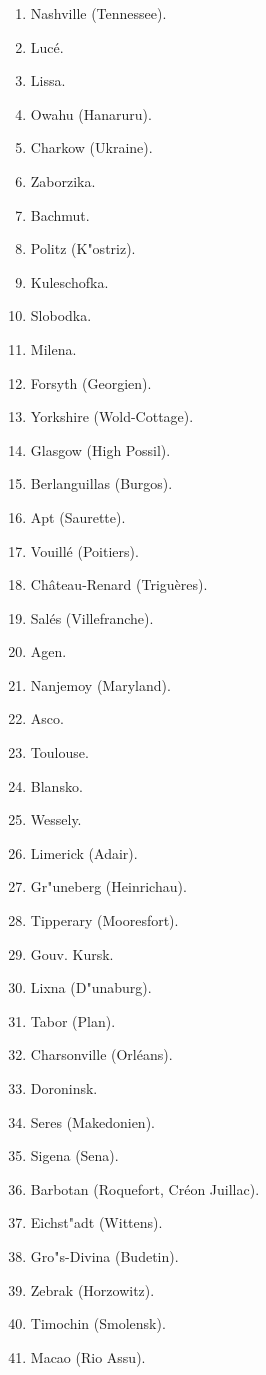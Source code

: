 \documentclass[a4paper, 11pt, oneside, polutonikogreek, german]{article}
\begin{document}
\begin{enumerate}
    \item Nashville (Tennessee).
    \item Lucé.
    \item Lissa.
    \item Owahu (Hanaruru).
    \item Charkow (Ukraine).
    \item Zaborzika.
    \item Bachmut.
    \item Politz (K"ostriz).
    \item Kuleschofka.
    \item Slobodka.
    \item Milena.
    \item Forsyth (Georgien).
    \item Yorkshire (Wold-Cottage).
    \item Glasgow (High Possil).
    \item Berlanguillas (Burgos).
    \item Apt (Saurette).
    \item Vouillé (Poitiers).
    \item Château-Renard (Triguères).
    \item Salés (Villefranche).
    \item Agen.
    \item Nanjemoy (Maryland).
    \item Asco.
    \item Toulouse.
    \item Blansko.
    \item Wessely.
    \item Limerick (Adair).
    \item Gr"uneberg (Heinrichau).
    \item Tipperary (Mooresfort).
    \item Gouv. Kursk.
    \item Lixna (D"unaburg).
    \item Tabor (Plan).
    \item Charsonville (Orléans).
    \item Doroninsk.
    \item Seres (Makedonien).
    \item Sigena (Sena).
    \item Barbotan (Roquefort, Créon Juillac).
    \item Eichst"adt (Wittens).
    \item Gro"s-Divina (Budetin).
    \item Zebrak (Horzowitz).
    \item Timochin (Smolensk).
    \item Macao (Rio Assu).
\end{enumerate}
\end{document}
